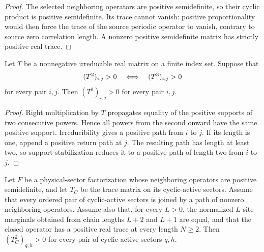\begin{proof}\leanok
    The selected neighboring operators are positive semidefinite, so their
    cyclic product is positive semidefinite. Its trace cannot vanish:
    positive proportionality would then force the trace of the source
    periodic operator to vanish, contrary to source zero correlation length.
    A nonzero positive semidefinite matrix has strictly positive real trace.
\end{proof}

\begin{lemma}
    \label{thm:matrix_irreducible_square_support_stabilization}
    \leanok
    Let $T$ be a nonnegative irreducible real matrix on a finite index set.
    Suppose that
    \begin{align}
        (T^2)_{i,j}>0
        \quad\Longleftrightarrow\quad
        (T^3)_{i,j}>0
        \notag
    \end{align}
    for every pair $i,j$. Then $(T^2)_{i,j}>0$ for every pair $i,j$.
\end{lemma}

\begin{proof}\leanok
    Right multiplication by $T$ propagates equality of the positive supports
    of two consecutive powers. Hence all powers from the second onward have
    the same positive support. Irreducibility gives a positive path from
    $i$ to $j$. If its length is one, append a positive return path at $j$.
    The resulting path has length at least two, so support stabilization
    reduces it to a positive path of length two from $i$ to $j$.
\end{proof}

\begin{lemma}
    \label{thm:mpdo_cyclic_active_square_positive_adjacent_marginals}
    \leanok
    Let $F$ be a physical-sector factorization whose neighboring operators are
    positive semidefinite, and let $T_C$ be the trace matrix on its
    cyclic-active sectors. Assume that every ordered pair of cyclic-active
    sectors is joined by a path of nonzero neighboring operators. Assume also
    that, for every $L>0$, the normalized $L$-site marginals obtained from
    chain lengths $L+2$ and $L+1$ are equal, and that the closed operator has
    a positive real trace at every length $N\geq2$. Then
    $(T_C^2)_{q,h}>0$ for every pair of cyclic-active sectors $q,h$.
\end{lemma}

